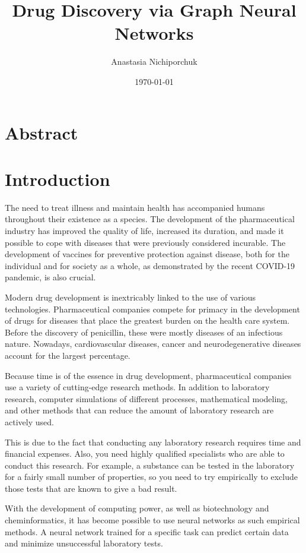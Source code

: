 \documentclass[a4paper,14pt]{article}
\author{Anastasia Nichiporchuk}
\title{Drug Discovery via Graph Neural Networks}
\date{\today}
\begin{document}

\maketitle

\section*{Abstract}

\section{Introduction}\label{1}

The need to treat illness and maintain health has accompanied humans throughout their existence as a species. The development of the pharmaceutical industry has improved the quality of life, increased its duration, and made it possible to cope with diseases that were previously considered incurable. The development of vaccines for preventive protection against disease, both for the individual and for society as a whole, as demonstrated by the recent COVID-19 pandemic, is also crucial. 

Modern drug development is inextricably linked to the use of various technologies. Pharmaceutical companies compete for primacy in the development of drugs for diseases that place the greatest burden on the health care system. Before the discovery of penicillin, these were mostly diseases of an infectious nature. Nowadays, cardiovascular diseases, cancer and neurodegenerative diseases account for the largest percentage.

Because time is of the essence in drug development, pharmaceutical companies use a variety of cutting-edge research methods. In addition to laboratory research, computer simulations of different processes, mathematical modeling, and other methods that can reduce the amount of laboratory research are actively used. 


This is due to the fact that conducting any laboratory research requires time and financial expenses. Also, you need highly qualified specialists who are able to conduct this research. For example, a substance can be tested in the laboratory for a fairly small number of properties, so you need to try empirically to exclude those tests that are known to give a bad result.

With the development of computing power, as well as biotechnology and cheminformatics, it has become possible to use neural networks as such empirical methods. A neural network trained for a specific task can predict certain data and minimize unsuccessful laboratory tests.
\end{document}
